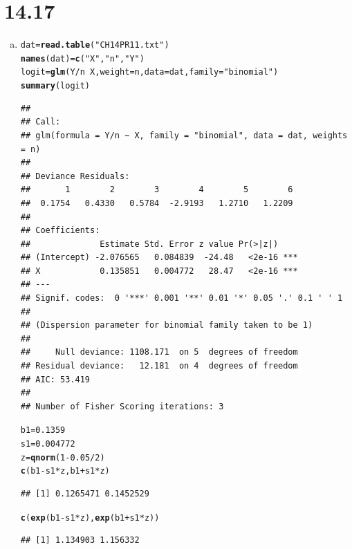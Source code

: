 \documentclass{article}\usepackage[]{graphicx}\usepackage[]{color}
\makeatletter
\newcommand{\hlnum}[1]{\textcolor[rgb]{0.686,0.059,0.569}{#1}}%
\newcommand{\hlstr}[1]{\textcolor[rgb]{0.192,0.494,0.8}{#1}}%
\newcommand{\hlopt}[1]{\textcolor[rgb]{0,0,0}{#1}}%
\newcommand{\hlstd}[1]{\textcolor[rgb]{0.345,0.345,0.345}{#1}}%
\newcommand{\hlkwb}[1]{\textcolor[rgb]{0.69,0.353,0.396}{#1}}%
\newcommand{\hlkwc}[1]{\textcolor[rgb]{0.333,0.667,0.333}{#1}}%
\newcommand{\hlkwd}[1]{\textcolor[rgb]{0.737,0.353,0.396}{\textbf{#1}}}%
\newenvironment{kframe}{%
 \def\at@end@of@kframe{}%
 \ifinner\ifhmode%
  \def\at@end@of@kframe{\end{minipage}}%
  \begin{minipage}{\columnwidth}%
 \fi\fi%
 \def\FrameCommand##1{\hskip\@totalleftmargin \hskip-\fboxsep
 \colorbox{shadecolor}{##1}\hskip-\fboxsep
     \hskip-\linewidth \hskip-\@totalleftmargin \hskip\columnwidth}%
 \MakeFramed {\advance\hsize-\width
   \@totalleftmargin\z@ \linewidth\hsize
   \@setminipage}}%
 {\par\unskip\endMakeFramed%
 \at@end@of@kframe}
\newenvironment{knitrout}{}{} %
\makeatother
\begin{document}
\section{14.17}

\begin{enumerate}[(a)]

\item

\begin{knitrout}
\color{fgcolor}\begin{kframe}
\begin{alltt}
  \hlstd{dat} \hlkwb{=} \hlkwd{read.table}\hlstd{(}\hlstr{"CH14PR11.txt"}\hlstd{)}
  \hlkwd{names}\hlstd{(dat)} \hlkwb{=} \hlkwd{c}\hlstd{(}\hlstr{"X"}\hlstd{,} \hlstr{"n"}\hlstd{,} \hlstr{"Y"}\hlstd{)}
  \hlstd{logit} \hlkwb{=} \hlkwd{glm}\hlstd{(Y}\hlopt{/}\hlstd{n} \hlopt{~} \hlstd{X,} \hlkwc{weight}\hlstd{=n,} \hlkwc{data} \hlstd{= dat,} \hlkwc{family} \hlstd{=} \hlstr{"binomial"}\hlstd{)}
  \hlkwd{summary}\hlstd{(logit)}
\end{alltt}
\begin{verbatim}
## 
## Call:
## glm(formula = Y/n ~ X, family = "binomial", data = dat, weights = n)
## 
## Deviance Residuals: 
##       1        2        3        4        5        6  
##  0.1754   0.4330   0.5784  -2.9193   1.2710   1.2209  
## 
## Coefficients:
##              Estimate Std. Error z value Pr(>|z|)    
## (Intercept) -2.076565   0.084839  -24.48   <2e-16 ***
## X            0.135851   0.004772   28.47   <2e-16 ***
## ---
## Signif. codes:  0 '***' 0.001 '**' 0.01 '*' 0.05 '.' 0.1 ' ' 1
## 
## (Dispersion parameter for binomial family taken to be 1)
## 
##     Null deviance: 1108.171  on 5  degrees of freedom
## Residual deviance:   12.181  on 4  degrees of freedom
## AIC: 53.419
## 
## Number of Fisher Scoring iterations: 3
\end{verbatim}
\begin{alltt}
  \hlstd{b1} \hlkwb{=} \hlnum{0.1359}
  \hlstd{s1} \hlkwb{=} \hlnum{0.004772}
  \hlstd{z} \hlkwb{=} \hlkwd{qnorm}\hlstd{(}\hlnum{1}\hlopt{-}\hlnum{0.05}\hlopt{/}\hlnum{2}\hlstd{)}
  \hlkwd{c}\hlstd{(b1}\hlopt{-}\hlstd{s1}\hlopt{*}\hlstd{z, b1}\hlopt{+}\hlstd{s1}\hlopt{*}\hlstd{z)}
\end{alltt}
\begin{verbatim}
## [1] 0.1265471 0.1452529
\end{verbatim}
\begin{alltt}
  \hlkwd{c}\hlstd{(}\hlkwd{exp}\hlstd{(b1}\hlopt{-}\hlstd{s1}\hlopt{*}\hlstd{z),} \hlkwd{exp}\hlstd{(b1}\hlopt{+}\hlstd{s1}\hlopt{*}\hlstd{z))}
\end{alltt}
\begin{verbatim}
## [1] 1.134903 1.156332
\end{verbatim}
\end{kframe}
\end{knitrout}


\end{enumerate}
\end{document}
